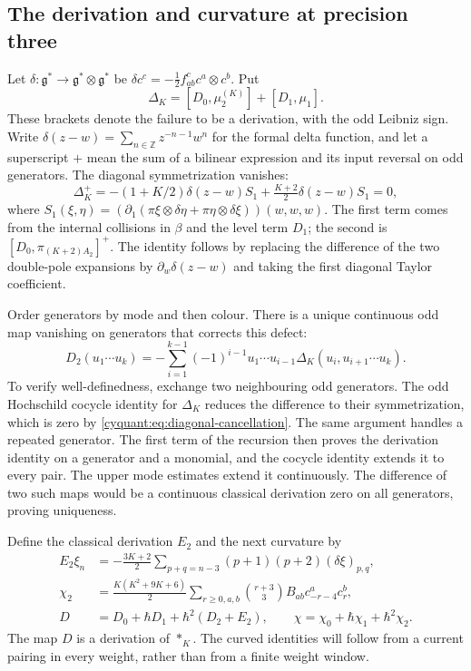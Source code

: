 \subsection{The derivation and curvature at precision three}

Let $\delta:\mathfrak g^*\to\mathfrak g^*\otimes\mathfrak g^*$ be
$\delta c^c=-\frac12f_{ab}^cc^a\otimes c^b$.
Put
\[
 \Delta_K=[D_0,\mu_2^{(K)}]+[D_1,\mu_1].
\]
These brackets denote the failure to be a derivation, with the odd
Leibniz sign.  Write $\delta(z-w)=\sum_{n\in\mathbb Z}z^{-n-1}w^n$
for the formal delta function, and let a superscript $+$ mean the sum
of a bilinear expression and its input reversal on odd generators.
The diagonal symmetrization vanishes:
\begin{equation}\label{cyquant:eq:diagonal-cancellation}
 \Delta_K^+
  =-(1+K/2)\delta(z-w)S_1+\tfrac{K+2}{2}\delta(z-w)S_1=0,
\end{equation}
where
$S_1(\xi,\eta)=(\partial_1(\pi\xi\otimes\delta\eta+
\pi\eta\otimes\delta\xi))(w,w,w)$.
The first term comes from the internal collisions in $\beta$ and
the level term $D_1$; the second is $[D_0,\pi_{(K+2)A_2}]^+$.
The identity follows by replacing the difference of the two
double-pole expansions by $\partial_w\delta(z-w)$ and taking the
first diagonal Taylor coefficient.

Order generators by mode and then colour.  There is a unique
continuous odd map vanishing on generators that corrects this defect:
\begin{equation}\label{cyquant:eq:Dtwo}
 D_2(u_1\cdots u_k)=
 -\sum_{i=1}^{k-1}(-1)^{i-1}u_1\cdots u_{i-1}
                          \Delta_K(u_i,u_{i+1}\cdots u_k).
\end{equation}
To verify well-definedness, exchange two neighbouring odd generators.
The odd Hochschild cocycle identity for $\Delta_K$ reduces the
difference to their symmetrization, which is zero by
\eqref{cyquant:eq:diagonal-cancellation}.  The same argument handles
a repeated generator.  The first term of the recursion then proves
the derivation identity on a generator and a monomial, and the
cocycle identity extends it to every pair.  The upper mode estimates
extend it continuously.  The difference of two such maps would be a
continuous classical derivation zero on all generators, proving
uniqueness.

Define the classical derivation $E_2$ and the next curvature by
\begin{equation}\label{cyquant:eq:second-curvature}
 \begin{aligned}
 E_2\xi_n&=-\frac{3K+2}{2}
       \sum_{p+q=n-3}(p+1)(p+2)(\delta\xi)_{p,q},\\
 \chi_2&=\frac{K(K^2+9K+6)}2
       \sum_{r\geq0,a,b}\binom{r+3}{3}B_{ab}c_{-r-4}^ac_r^b,\\
 D&=D_0+\hbar D_1+\hbar^2(D_2+E_2),\qquad
 \chi=\chi_0+\hbar\chi_1+\hbar^2\chi_2.
 \end{aligned}
\end{equation}
The map $D$ is a derivation of $*_K$.  The curved identities will
follow from a current pairing in every weight, rather than from a
finite weight window.

